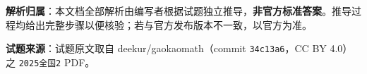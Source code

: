 

\begin{gknotice}
\textbf{解析归属}：本文档全部解析由编写者根据试题独立推导，\textbf{非官方标准答案}。推导过程均给出完整步骤以便核验；若与官方发布版本不一致，以官方为准。

\textbf{试题来源}：试题原文取自 deekur/gaokaomath（commit \texttt{34c13a6}，CC BY 4.0）之 \texttt{2025全国2} PDF。
\end{gknotice}

\par\medskip


